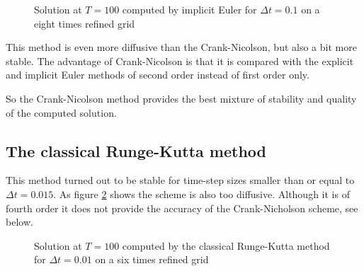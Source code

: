 \documentclass[a4paper, 11pt, twoside]{article}
\begin{document}
\begin{figure}[htbp]
\begin{center}
\caption{Solution at $T = 100$ computed by implicit Euler for $\Delta t = 0.1$ on a eight times refined grid}
\label{implicit_ref6_step0.1}
\end{center}
\end{figure}

This method is even more diffusive than the Crank-Nicolson, but also a bit more stable. The advantage of Crank-Nicolson is that it is compared with the explicit and implicit Euler methods of second order instead of first order only.

So the Crank-Nicolson method provides the best mixture of stability and quality of the computed solution.

\subsection{The classical Runge-Kutta method}

This method turned out to be stable for time-step sizes smaller than or equal to $\Delta t = 0.015$. As figure \ref{rk_ref6_step0.01} shows the scheme is also too diffusive. Although it is of fourth order it does not provide the accuracy of the Crank-Nicholson scheme, see below.

\begin{figure}[htbp]
\begin{center}
\caption{Solution at $T = 100$ computed by the classical Runge-Kutta method for $\Delta t = 0.01$ on a six times refined grid}
\label{rk_ref6_step0.01}
\end{center}
\end{figure}
\end{document}
